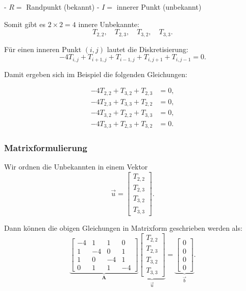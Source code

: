 - $R =$ Randpunkt (bekannt)  
- $I =$ innerer Punkt (unbekannt)

Somit gibt es $2\times 2 = 4$ innere Unbekannte: 
\[
T_{2,2}, \quad T_{2,3}, \quad T_{3,2}, \quad T_{3,3}.
\]


Für einen inneren Punkt $(i,j)$ lautet die Diskretisierung:
\[
-4T_{i,j} + T_{i+1,j} + T_{i-1,j} + T_{i,j+1} + T_{i,j-1} = 0.
\]

Damit ergeben sich im Beispiel die folgenden Gleichungen:

\begin{align*}
	-4T_{2,2} + T_{3,2} + T_{2,3} &= 0, \\
	-4T_{2,3} + T_{3,3} + T_{2,2} &= 0, \\
	-4T_{3,2} + T_{2,2} + T_{3,3} &= 0, \\
	-4T_{3,3} + T_{2,3} + T_{3,2} &= 0.
\end{align*}

\subsubsection*{Matrixformulierung}

Wir ordnen die Unbekannten in einem Vektor
\[
\vec{u} =
\begin{bmatrix}
	T_{2,2} \\ T_{2,3} \\ T_{3,2} \\ T_{3,3}
\end{bmatrix}.
\]

Dann können die obigen Gleichungen in Matrixform geschrieben werden als:
\[
\underbrace{\begin{bmatrix}
		-4 &  1 &  1 &  0 \\
		1 & -4 &  0 &  1 \\
		1 &  0 & -4 &  1 \\
		0 &  1 &  1 & -4
\end{bmatrix}}_{\mathbf{A}}
\underbrace{\begin{bmatrix}
		T_{2,2} \\ T_{2,3} \\ T_{3,2} \\ T_{3,3}
\end{bmatrix}}_{\vec{u}}
=
\underbrace{\begin{bmatrix}
		0 \\ 0 \\ 0 \\ 0
\end{bmatrix}}_{\vec{b}}.
\]


